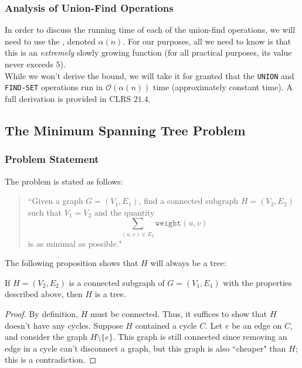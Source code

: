 \subsubsection{Analysis of Union-Find Operations}


In order to discuss the running time of each of the union-find operations, we will need to use the , denoted $\alpha(n)$. For our purposes, all we need to know is that this is an \textit{extremely} slowly growing function (for all practical purposes, its value never exceeds $5$). \\

While we won't derive the bound, we will take it for granted that the \verb!UNION! and \verb!FIND-SET! operations run in $\mathcal{O}(\alpha(n))$ time (approximately constant time). A full derivation is provided in CLRS $21.4$. 



\subsection{The Minimum Spanning Tree Problem}

\subsubsection{Problem Statement}

The  problem is stated as follows: 
\begin{quote}
    ``Given a graph $G = (V_1, E_1)$, find a connected subgraph $H = (V_2, E_2)$ such that $V_1 = V_2$ and the quantity
    \[
    \sum_{(u, v) \in E_2} \texttt{weight}(u, v)
    \]
    is as minimal as possible." 
\end{quote}

The following proposition shows that $H$ will always be a tree:

\begin{proposition}
If $H = (V_2, E_2)$ is a connected subgraph of $G = (V_1, E_1)$ with the properties described above, then $H$ is a tree.  
\end{proposition}
\begin{proof}
By definition, $H$ must be connected. Thus, it suffices to show that $H$ doesn't have any cycles. Suppose $H$ contained a cycle $C$. Let $e$ be an edge on $C$, and consider the graph $H \setminus \{e\}$. This graph is still connected since removing an edge in a cycle can't disconnect a graph, but this graph is also ``cheaper" than $H$; this is a contradiction.
\end{proof}

